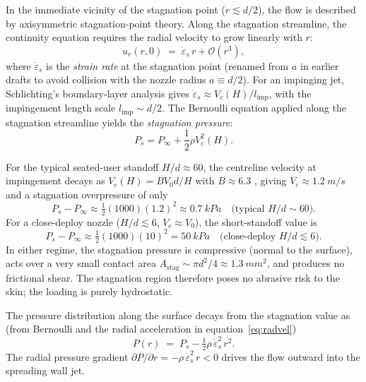 \documentclass[aps,prfluids,reprint,amsmath,amssymb,floatfix]{revtex4-2}
\begin{document}
In the immediate vicinity of the stagnation point ($r \lesssim d/2$), the
flow is described by axisymmetric stagnation-point theory. Along the
stagnation streamline, the continuity equation requires the radial velocity
to grow linearly with $r$:
\begin{equation}
    u_r(r, 0) \;=\; \dot\varepsilon_s\,r + \mathcal{O}(r^3),
    \label{eq:radvel}
\end{equation}
where $\dot\varepsilon_s$ is the \emph{strain rate} at the stagnation
point (renamed from $a$ in earlier drafts to avoid collision with the
nozzle radius $a \equiv d/2$). For an impinging jet, Schlichting's
boundary-layer analysis gives $\dot\varepsilon_s \approx V_c(H)/
l_\mathrm{imp}$, with the impingement length scale $l_\mathrm{imp}
\sim d/2$. The Bernoulli equation applied along the stagnation
streamline yields the \emph{stagnation pressure}:
\begin{equation}
    P_s = P_\infty + \frac{1}{2}\rho V_c^2(H).
    \label{eq:stagpress}
\end{equation}

For the typical seated-user standoff $H/d \approx 60$, the centreline
velocity at impingement decays as $V_c(H) = B V_0 d/H$ with $B \approx 6.3$
\citep{PopeBook}, giving $V_c \approx \SI{1.2}{m/s}$ and a stagnation
overpressure of only
\begin{equation}
    P_s - P_\infty \approx \tfrac{1}{2}(1000)(1.2)^2 \approx \SI{0.7}{kPa}
    \quad \text{(typical $H/d \sim 60$)}.
    \label{eq:stagval}
\end{equation}
For a close-deploy nozzle ($H/d \lesssim 6$, $V_c \approx V_0$), the
short-standoff value is
\begin{equation}
    P_s - P_\infty \approx \tfrac{1}{2}(1000)(10)^2 = \SI{50}{kPa}
    \quad \text{(close-deploy $H/d \lesssim 6$)}.
    \label{eq:stagshort}
\end{equation}
In either regime, the stagnation pressure is compressive (normal to the
surface), acts over a very small contact area
$A_\mathrm{stag} \sim \pi d^2/4 \approx \SI{1.3}{mm^2}$, and produces no
frictional shear. The stagnation region therefore poses no abrasive risk to
the skin; the loading is purely hydrostatic.

The pressure distribution along the surface decays from the stagnation value
as (from Bernoulli and the radial acceleration in equation~\ref{eq:radvel})
\begin{equation}
    P(r) \;=\; P_s - \tfrac{1}{2}\rho\,\dot\varepsilon_s^2\,r^2.
    \label{eq:pressuredist}
\end{equation}
The radial pressure gradient
$\partial P/\partial r = -\rho\,\dot\varepsilon_s^2\,r < 0$
drives the flow outward into the spreading wall jet.
\end{document}
